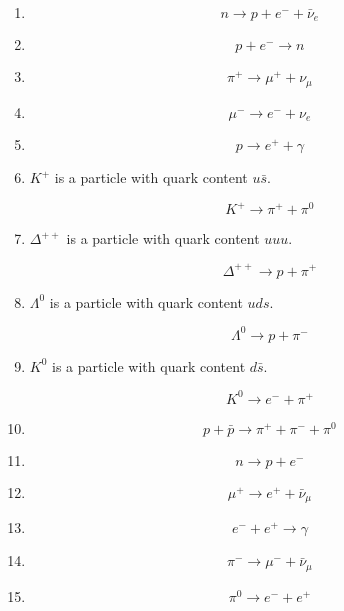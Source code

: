 \documentclass[12pt]{article}
\newcommand{\workspace}{
\vspace{1.2cm}
}
\begin{document}
\begin{enumerate}


\item
\[
n \rightarrow p + e^- + \bar{\nu}_e
\]
\workspace

\item
\[
p + e^- \rightarrow n
\]
\workspace

\item
\[
\pi^+ \rightarrow \mu^+ + \nu_\mu
\]
\workspace

\item
\[
\mu^- \rightarrow e^- + \nu_e
\]
\workspace

\item
\[
p \rightarrow e^+ + \gamma
\]
\workspace

\item
$K^+$ is a particle with quark content $u\bar{s}$.

\[
K^+ \rightarrow \pi^+ + \pi^0
\]
\workspace

\item
$\Delta^{++}$ is a particle with quark content $uuu$.

\[
\Delta^{++} \rightarrow p + \pi^+
\]
\workspace

\item
$\Lambda^0$ is a particle with quark content $uds$.

\[
\Lambda^0 \rightarrow p + \pi^-
\]
\workspace

\item
$K^0$ is a particle with quark content $d\bar{s}$.

\[
K^0 \rightarrow e^- + \pi^+
\]
\workspace

\item
\[
p + \bar{p} \rightarrow \pi^+ + \pi^- + \pi^0
\]
\workspace


\item
\[
n \rightarrow p + e^- 
\]
\workspace

\item
\[
\mu^+ \rightarrow e^+ + \bar{\nu}_\mu
\]
\workspace

\item
\[
e^- + e^+ \rightarrow \gamma
\]
\workspace

\item
\[
\pi^- \rightarrow \mu^- + \bar{\nu}_\mu
\]
\workspace

\item
\[
\pi^0 \rightarrow e^- + e^+
\]
\workspace


\end{enumerate}
\end{document}

